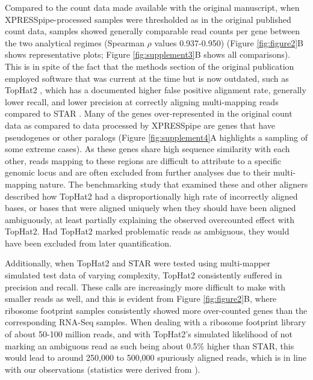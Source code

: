 \documentclass[10pt, oneside]{article}
\begin{document}
Compared to the count data made available with the original manuscript, when XPRESSpipe-processed samples were thresholded as in the original published count data, samples showed generally comparable read counts per gene between the two analytical regimes (Spearman $\rho$ values 0.937-0.950) (Figure \ref{fig:figure2}B shows representative plots; Figure \ref{fig:supplement3}B shows all comparisons). This is in spite of the fact that the methods section of the original publication employed software that was current at the time but is now outdated, such as TopHat2 \cite{tophat2}, which has a documented higher false positive alignment rate, generally lower recall, and lower precision at correctly aligning multi-mapping reads compared to STAR \cite{alignment_benchmark, alignment_benchmark2, star}. Many of the genes over-represented in the original count data as compared to data processed by XPRESSpipe are genes that have pseudogenes or other paralogs (Figure \ref{fig:supplement4}A highlights a sampling of some extreme cases). As these genes share high sequence similarity with each other, reads mapping to these regions are difficult to attribute to a specific genomic locus and are often excluded from further analyses due to their multi-mapping nature. The benchmarking study \cite{alignment_benchmark} that examined these and other aligners described how TopHat2 had a disproportionally high rate of incorrectly aligned bases, or bases that were aligned uniquely when they should have been aligned ambiguously, at least partially explaining the observed overcounted effect with TopHat2. Had TopHat2 marked problematic reads as ambiguous, they would have been excluded from later quantification.\par

Additionally, when TopHat2 and STAR were tested using multi-mapper simulated test data of varying complexity, TopHat2 consistently suffered in precision and recall. These calls are increasingly more difficult to make with smaller reads as well, and this is evident from Figure \ref{fig:figure2}B, where ribosome footprint samples consistently showed more over-counted genes than the corresponding RNA-Seq samples. When dealing with a ribosome footprint library of about 50-100 million reads, and with TopHat2's simulated likelihood of not marking an ambiguous read as such being about 0.5\% higher than STAR, this would lead to around 250,000 to 500,000 spuriously aligned reads, which is in line with our observations (statistics were derived from \cite{alignment_benchmark}).\par
\end{document}
